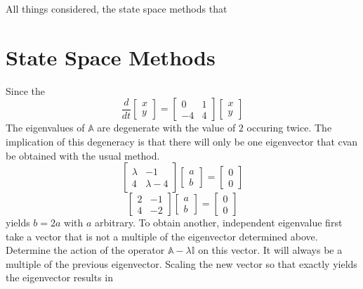 \documentclass[10pt]{article}
\begin{document}
All things considered, the state space methods that 
\section{State Space Methods}

Since the 
\[
   \frac{d}{dt} \left[ \begin{array}{c}x \\ y \end{array} \right]
     = \left[ \begin{array}{cc}
                             0  & 1 \\
                             -4 & 4 
                       \end{array} \right]
      \left[ \begin{array}{c}x \\ y \end{array} \right]
\]
The eigenvalues of $\mathbb A$ are degenerate with the value of $2$ occuring twice.
The implication of this degeneracy is that there will only be one eigenvector that
cvan be obtained with the usual method.
\[
  \left[\begin{array}{cc} \lambda & -1 \\ 4 & \lambda - 4 \end{array}\right]
     \left[\begin{array}{c} a \\ b\end{array}\right]
   = \left[\begin{array}{c} 0 \\ 0 \end{array}\right]
\]
\[
  \left[\begin{array}{cc} 2 & -1 \\ 4 & -2 \end{array}\right]
     \left[\begin{array}{c} a \\ b\end{array}\right]
   = \left[\begin{array}{c} 0 \\ 0 \end{array}\right]
\]
yields $b = 2a$ with $a$ arbitrary.
To obtain another, independent eigenvalue first take a vector that is not a multiple of the
eigenvector determined above. Determine the action of 
the operator ${\mathbb A} - \lambda {\mathbb I}$ on this vector.  It will always be a multiple of 
the previous eigenvector.  Scaling the new vector so that exactly yields the eigenvector results in 
\end{document}
